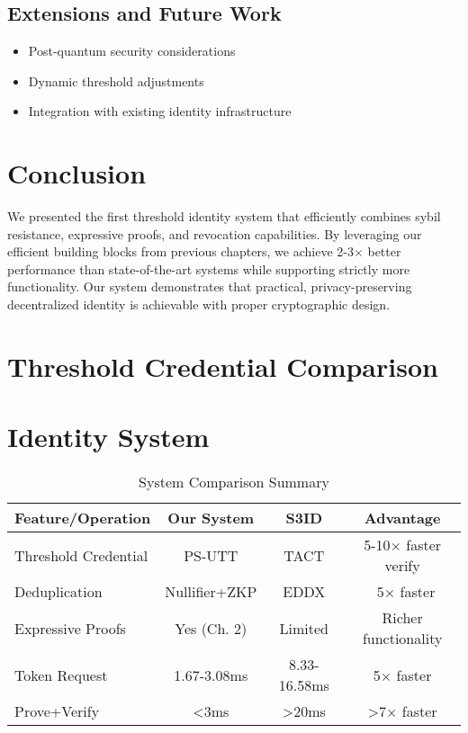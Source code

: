 \subsection{Extensions and Future Work}
\begin{itemize}
    \item Post-quantum security considerations
    \item Dynamic threshold adjustments
    \item Integration with existing identity infrastructure
\end{itemize}

\section{Conclusion}
\label{sec:threshold-conclusion}

We presented the first threshold identity system that efficiently combines sybil resistance, expressive proofs, and revocation capabilities. By leveraging our efficient building blocks from previous chapters, we achieve 2-3× better performance than state-of-the-art systems while supporting strictly more functionality. Our system demonstrates that practical, privacy-preserving decentralized identity is achievable with proper cryptographic design.














\section{Threshold Credential Comparison}




\section{Identity System}

\begin{table}[h]
\centering
\caption{System Comparison Summary}
\begin{tabular}{lccc}
\toprule
\textbf{Feature/Operation} & \textbf{Our System} & \textbf{S3ID} & \textbf{Advantage} \\
\midrule
Threshold Credential & PS-UTT & TACT & 5-10× faster verify \\
Deduplication & Nullifier+ZKP & EDDX & ~5× faster \\
Expressive Proofs & Yes (Ch. 2) & Limited & Richer functionality \\
Token Request & 1.67-3.08ms & 8.33-16.58ms & 5× faster \\
Prove+Verify & <3ms & >20ms & >7× faster \\
\bottomrule
\end{tabular}
\end{table}
